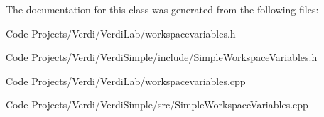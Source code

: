 \-The documentation for this class was generated from the following files\-:\begin{DoxyCompactItemize}
\item 
\-Code Projects/\-Verdi/\-Verdi\-Lab/workspacevariables.\-h\item 
\-Code Projects/\-Verdi/\-Verdi\-Simple/include/\-Simple\-Workspace\-Variables.\-h\item 
\-Code Projects/\-Verdi/\-Verdi\-Lab/workspacevariables.\-cpp\item 
\-Code Projects/\-Verdi/\-Verdi\-Simple/src/\-Simple\-Workspace\-Variables.\-cpp\end{DoxyCompactItemize}
